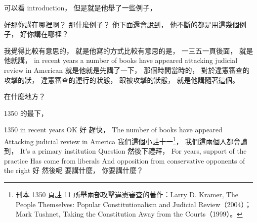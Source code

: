 \hypertarget{w06:cue:179}{}可以看 introduction，
\hypertarget{w06:cue:180}{}但是就是他舉了一些例子，

\hypertarget{w06:cue:181}{}好那你講在哪裡啊？
\hypertarget{w06:cue:182}{}那什麼例子？
\hypertarget{w06:cue:183}{}他下面還會說到，
\hypertarget{w06:cue:184}{}他不斷的都是用這幾個例子，
\hypertarget{w06:cue:185}{}好你講在哪裡？

\hypertarget{w06:cue:186}{}我覺得比較有意思的，
\hypertarget{w06:cue:187}{}就是他寫的方式比較有意思的是，
\hypertarget{w06:cue:188}{}一三五一頁後面，
\hypertarget{w06:cue:189}{}就是他就講，
\hypertarget{w06:cue:190}{}in recent years a number of books have appeared
\hypertarget{w06:cue:191}{}attacking judicial review in American
\hypertarget{w06:cue:192}{}就是他就是先講了一下，
\hypertarget{w06:cue:193}{}那個時間當時的，
\hypertarget{w06:cue:194}{}對於違憲審查的攻擊的狀，
\hypertarget{w06:cue:195}{}違憲審查的運行的狀態，
\hypertarget{w06:cue:196}{}跟被攻擊的狀態，
\hypertarget{w06:cue:197}{}就是他講隨著這個。

\hypertarget{w06:cue:198}{}在什麼地方？

\hypertarget{w06:cue:199}{}1350 的最下，

\hypertarget{w06:cue:200}{}1350 in recent years
\hypertarget{w06:cue:201}{}OK 好 趕快，
\hypertarget{w06:cue:202}{}The number of books have appeared
\hypertarget{w06:cue:203}{}Attacking judicial review in America
\hypertarget{w06:cue:204}{}我們這個小註十一\footnote{刊本 1350 頁註 11 所舉兩部攻擊違憲審查的著作：Larry D. Kramer, The People Themselves: Popular Constitutionalism and Judicial Review（2004）；Mark Tushnet, Taking the Constitution Away from the Courts（1999）。}，
\hypertarget{w06:cue:205}{}我們這兩個人都會讀到，
\hypertarget{w06:cue:206}{}It's a primary institution
\hypertarget{w06:cue:207}{}Question 然後下禮拜，
\hypertarget{w06:cue:208}{}For years, support of the practice
\hypertarget{w06:cue:209}{}Has come from liberals
\hypertarget{w06:cue:210}{}And opposition from conservative opponents of the right
\hypertarget{w06:cue:211}{}好 然後呢 要講什麼，
\hypertarget{w06:cue:212}{}你要講什麼？

